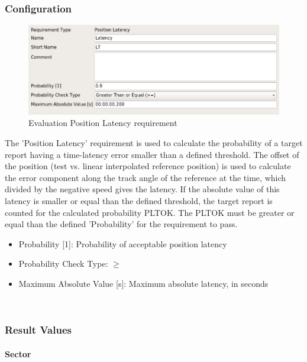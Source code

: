\subsubsection{Configuration}

\begin{figure}[H]
    \includegraphics[width=14cm,frame]{../screenshots/eval_req_pos_latency.png}
  \caption{Evaluation Position Latency requirement}
\end{figure}

The 'Position Latency' requirement is used to calculate the probability of a target report having a time-latency error smaller than a defined threshold. The offset of the position (test vs. linear interpolated reference position) is used to calculate the error component along the track angle of the reference at the time, which divided by the negative speed gives the latency. If the absolute value of this latency is smaller or equal than the defined threshold, the target report is counted for the calculated probability PLTOK. The PLTOK must be greater or equal than the defined 'Probability' for the requirement to pass. \\

\begin{itemize}  
\item Probability [1]: Probability of acceptable position latency
\item Probability Check Type: $\geq$
\item Maximum Absolute Value [s]: Maximum absolute latency, in seconds
\end{itemize}
\ \\

\subsubsection{Result Values}

\paragraph{Sector}

